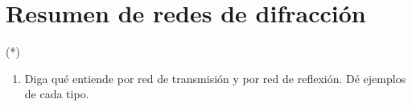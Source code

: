 \section*{Resumen de redes de difracción}

\item (*) 
\begin{enumerate}
	\item Diga qué entiende por red de transmisión y por red de reflexión.
	Dé ejemplos de cada tipo.
\end{enumerate}
